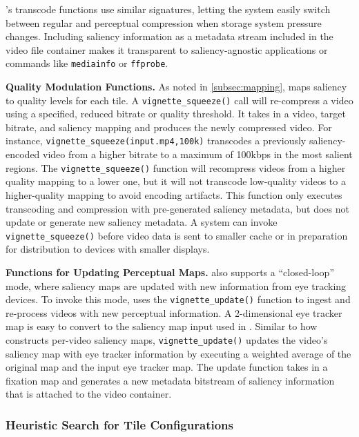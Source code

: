\nameStore's transcode functions use similar signatures, letting the system easily switch between regular and perceptual compression when storage system pressure changes.
Including saliency information as a metadata stream included in the video file container makes it transparent to saliency-agnostic applications or commands like \texttt{mediainfo} or \texttt{ffprobe}.

\noindent\textbf{Quality Modulation Functions.}
As noted in \ref{subsec:mapping}, \nameCompress maps saliency to quality levels for each tile.
A \texttt{vignette\_squeeze()} call will re-compress a video using a specified, reduced bitrate or quality threshold.
It takes in a video, target bitrate, and saliency mapping and produces the newly compressed video.
For instance, \texttt{vignette\_squeeze(input.mp4,100k)} transcodes a previously saliency-encoded video from a higher bitrate to a maximum of 100kbps in the most salient regions.
The \texttt{vignette\_squeeze()} function will recompress videos from a higher quality mapping to a lower one, but it will not transcode low-quality videos to a higher-quality mapping to avoid encoding artifacts.
This function only executes transcoding and compression with pre-generated saliency metadata, but does not update or generate new saliency metadata.
A system can invoke \texttt{vignette\_squeeze()} before video data is sent to smaller cache or in preparation for distribution to devices with smaller displays.

\noindent\textbf{Functions for Updating Perceptual Maps.}
\nameStore also supports a ``closed-loop'' mode, where saliency maps are updated with new information from eye tracking devices.
To invoke this mode, \nameStore uses the \texttt{vignette\_update()} function to ingest and re-process videos with new perceptual information.
A 2-dimensional eye tracker map is easy to convert to the saliency map input used in \nameCompress.
Similar to how \name constructs per-video saliency maps, \texttt{vignette\_update()} updates the video's saliency map with eye tracker information by executing a weighted average of the original map and the input eye tracker map.
The update function takes in a fixation map and generates a new metadata bitstream of saliency information that is attached to the video container.

\subsubsection{Heuristic Search for Tile Configurations}
\label{subsec:search-algo}

